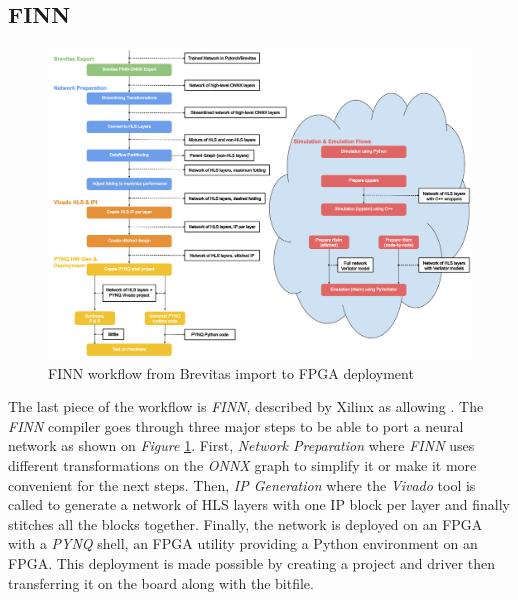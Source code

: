 \subsection{FINN}

\begin{figure}[htbp]
	\centering
		\includegraphics[width=16cm]{Figures/FINNWholeFlow.png}
	\caption[FINN whole flow]{FINN workflow from Brevitas import to FPGA deployment}
	\label{fig:FINNWholeFlow}
\end{figure}

The last piece of the workflow is \emph{FINN}, described by Xilinx as allowing . The \emph{FINN} compiler goes through three major steps to be able to port a neural network as shown on \emph{Figure} \ref{fig:FINNWholeFlow}. First, \emph{Network Preparation} where \emph{FINN} uses different transformations on the \emph{ONNX} graph to simplify it or make it more convenient for the next steps. Then, \emph{IP Generation} where the \emph{Vivado} tool is called to generate a network of HLS layers with one IP block per layer and finally stitches all the blocks together. Finally, the network is deployed on an FPGA with a \emph{PYNQ} shell, an FPGA utility providing a Python environment on an FPGA. This deployment is made possible by creating a project and driver then transferring it on the board along with the bitfile.

